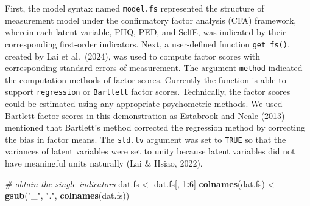 \documentclass[
  man]{apa7}
\newenvironment{Shaded}{\begin{snugshade}}{\end{snugshade}}
\newcommand{\CommentTok}[1]{\textcolor[rgb]{0.56,0.35,0.01}{\textit{#1}}}
\newcommand{\DecValTok}[1]{\textcolor[rgb]{0.00,0.00,0.81}{#1}}
\newcommand{\FunctionTok}[1]{\textcolor[rgb]{0.13,0.29,0.53}{\textbf{#1}}}
\newcommand{\NormalTok}[1]{#1}
\newcommand{\OtherTok}[1]{\textcolor[rgb]{0.56,0.35,0.01}{#1}}
\newcommand{\SpecialCharTok}[1]{\textcolor[rgb]{0.81,0.36,0.00}{\textbf{#1}}}
\newcommand{\StringTok}[1]{\textcolor[rgb]{0.31,0.60,0.02}{#1}}
\begin{document}
First, the model syntax named \texttt{model.fs} represented the structure of measurement model under the confirmatory factor analysis (CFA) framework, wherein each latent variable, PHQ, PED, and SelfE, was indicated by their corresponding first-order indicators. Next, a user-defined function \texttt{get\_fs()}, created by Lai et al.~(2024), was used to compute factor scores with corresponding standard errors of measurement. The argument \texttt{method} indicated the computation methods of factor scores. Currently the function is able to support \texttt{regression} or \texttt{Bartlett} factor scores. Technically, the factor scores could be estimated using any appropriate psychometric methods. We used Bartlett factor scores in this demonstration as Estabrook and Neale (2013) mentioned that Bartlett's method corrected the regression method by correcting the bias in factor means. The \texttt{std.lv} argument was set to \texttt{TRUE} so that the variances of latent variables were set to unity because latent variables did not have meaningful units naturally (Lai \& Hsiao, 2022).

\begin{Shaded}
\begin{Highlighting}[]
\CommentTok{\# obtain the single indicators}
\NormalTok{dat.fs }\OtherTok{\textless{}{-}}\NormalTok{ dat.fs[, }\DecValTok{1}\SpecialCharTok{:}\DecValTok{6}\NormalTok{]}
\FunctionTok{colnames}\NormalTok{(dat.fs) }\OtherTok{\textless{}{-}} \FunctionTok{gsub}\NormalTok{(}\StringTok{"\_"}\NormalTok{, }\StringTok{"."}\NormalTok{, }\FunctionTok{colnames}\NormalTok{(dat.fs))}
\end{Highlighting}
\end{Shaded}

\begin{Shaded}
\end{Shaded}
\end{document}
